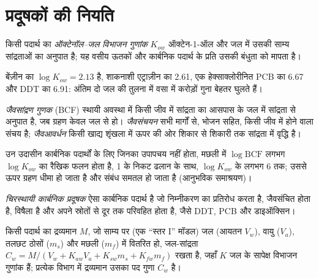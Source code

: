 \section{प्रदूषकों की नियति}

\begin{definition}[ऑक्टेनॉल--जल विभाजन गुणांक]\label{def:b3:environmental-toxicology:kow}
किसी पदार्थ का \emph{ऑक्टेनॉल--जल विभाजन गुणांक}
$K_{ow}$ ऑक्टेन-1-ऑल और जल में उसकी साम्य सांद्रताओं का
अनुपात है; यह वसीय ऊतकों और कार्बनिक पदार्थ के प्रति उसकी बंधुता को
मापता है।
\end{definition}

बेंज़ीन का $\log K_{ow} = 2.13$ है, शाकनाशी एट्राज़ीन का 2.61, एक हेक्साक्लोरीनित PCB का 6.67 और
DDT का 6.91: अंतिम दो जल की तुलना में वसा में करोड़ों गुना बेहतर
घुलते हैं।

\begin{definition}[जैवसंचयन]\label{def:b3:environmental-toxicology:bio}
\emph{जैवसांद्रण गुणक} (BCF) स्थायी अवस्था में किसी जीव में
सांद्रता का आसपास के जल में सांद्रता से अनुपात है, जब ग्रहण
केवल जल से हो। \emph{जैवसंचयन}
सभी मार्गों से, भोजन सहित, किसी जीव में होने वाला संचय है;
\emph{जैवआवर्धन} किसी खाद्य शृंखला में ऊपर की ओर
शिकार से शिकारी तक सांद्रता में वृद्धि है।
\end{definition}

\begin{proposition}[BCF और $K_{ow}$]\label{prop:b3:environmental-toxicology:bcf-kow}
उन उदासीन कार्बनिक पदार्थों के लिए जिनका उपापचय नहीं होता, मछली में $\log\mathrm{BCF}$
लगभग $\log K_{ow}$ का रैखिक फलन होता है, 1 के निकट ढलान के साथ, $\log K_{ow}$ के लगभग 6 तक;
उससे ऊपर ग्रहण धीमा हो जाता है और संबंध समतल हो जाता है (आनुभविक समाश्रयण)।
\admitted
\end{proposition}

\begin{definition}[चिरस्थायी कार्बनिक प्रदूषक]\label{def:b3:environmental-toxicology:pop}
\emph{चिरस्थायी कार्बनिक प्रदूषक} ऐसा
कार्बनिक पदार्थ है जो निम्नीकरण का प्रतिरोध करता है, जैवसंचित होता है, विषैला है और
अपने स्रोतों से दूर तक परिवहित होता है, जैसे DDT, PCB और डाइऑक्सिन।
\end{definition}

\begin{proposition}[विभागों के बीच साम्य वितरण]\label{prop:b3:environmental-toxicology:level-one}
किसी पदार्थ का द्रव्यमान $M$, जो साम्य पर (एक ``स्तर I'' मॉडल) जल
(आयतन $V_w$), वायु ($V_a$), तलछट ठोसों ($m_s$) और मछली ($m_f$) में वितरित हो, जल-सांद्रता
$C_w = M/(V_w + K_{aw}V_a + K_{sw}m_s + K_{fw}m_f)$ रखता है, जहाँ $K$ जल के सापेक्ष विभाजन गुणांक हैं;
प्रत्येक विभाग में द्रव्यमान उसका पद गुणा $C_w$ है।
\end{proposition}

